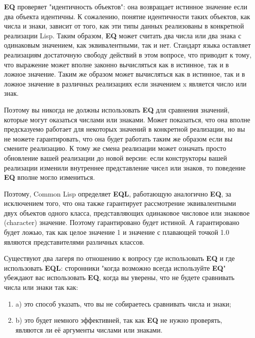 \textbf{EQ} проверяет "идентичность объектов": она возвращает истинное значение если два
объекта идентичны. К сожалению, понятие идентичности таких объектов, как числа и знаки,
зависит от того, как эти типы данных реализованы в конкретной реализации Lisp. Таким
образом, \textbf{EQ} может считать два числа или два знака с одинаковым значением, как
эквивалентными, так и нет. Стандарт языка оставляет реализациям достаточную свободу
действий в этом вопросе, что приводит к тому, что выражение  может вполне
законно вычисляться как в истинное, так и в ложное значение. Таким же образом  может вычисляться как в истинное, так и в ложное значение в различных реализациях
если значением x является число или знак.

Поэтому вы никогда не должны использовать \textbf{EQ} для сравнения значений, которые
могут оказаться числами или знаками. Может показаться, что она вполне предсказуемо
работает для некоторых значений в конкретной реализации, но вы не можете гарантировать,
что она будет работать таким же образом если вы смените реализацию. К тому же смена
реализации может означать просто обновление вашей реализации до новой версии: если
конструкторы вашей реализации изменили внутреннее представление чисел или знаков, то
поведение \textbf{EQ} вполне могло измениться.

Поэтому, Common Lisp определяет \textbf{EQL}, работающую аналогично \textbf{EQ}, за
исключением того, что она также гарантирует рассмотрение эквивалентными двух объектов
одного класса, представляющих одинаковое числовое или знаковое (character)
значение. Поэтому  гарантировано будет истиной. А 
гарантировано будет ложью, так как целое значение 1 и значение с плавающей точкой 1.0
являются представителями различных классов.

Существуют два лагеря по отношению к вопросу где использовать \textbf{EQ} и где
использовать \textbf{EQL}: сторонники "когда возможно всегда используйте \textbf{EQ}"
убеждают вас использовать \textbf{EQ}, когда вы уверены, что не будете сравнивать числа
или знаки так как:

\begin{enumerate}
\item a) это способ указать, что вы не собираетесь сравнивать числа и знаки; 

\item b) это будет немного эффективней, так как \textbf{EQ} не нужно проверять, являются
  ли её аргументы числами или знаками.
\end{enumerate}

